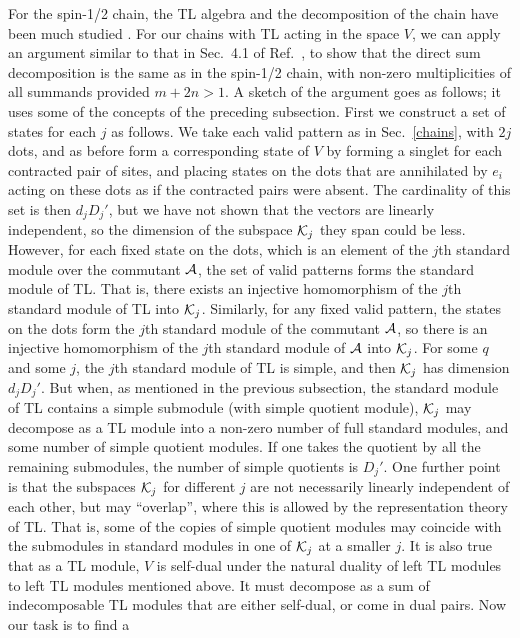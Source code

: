 \documentclass[twocolumn,floats,pra]{revtex4}
\def \cA {{\cal A}}
\begin{document}
For the spin-1/2 chain, the TL algebra and the decomposition of
the chain have been much studied
\cite{martinch7,gw,martin1,martin2}. For our chains with TL acting
in the space $V$, we can apply an argument similar to that in
Sec.\ 4.1 of Ref.\ \cite{martin2}, to show that the direct sum
decomposition is the same as in the spin-1/2 chain, with non-zero
multiplicities of all summands provided $m+2n>1$. A sketch of the
argument goes as follows; it uses some of the concepts of the
preceding subsection. First we construct a set of states for each
$j$ as follows. We take each valid pattern as in Sec.\
\ref{chains}, with $2j$ dots, and as before form a corresponding
state of $V$ by forming a singlet for each contracted pair of
sites, and placing states on the dots that are annihilated by
$e_i$ acting on these dots as if the contracted pairs were absent.
The cardinality of this set is then $d_jD_j'$, but we have not
shown that the vectors are linearly independent, so the dimension
of the subspace ${\cal K}_j$ they span could be less. However, for
each fixed state on the dots, which is an element of the $j$th
standard module over the commutant $\cA$, the set of valid
patterns forms the standard module of TL. That is, there exists an
injective homomorphism of the $j$th standard module of TL into
${\cal K}_j$. Similarly, for any fixed valid pattern, the states
on the dots form the $j$th standard module of the commutant $\cA$,
so there is an injective homomorphism of the $j$th standard module
of $\cA$ into ${\cal K}_j$. For some $q$ and some $j$, the $j$th
standard module of TL is simple, and then ${\cal K}_j$ has
dimension $d_jD_j'$. But when, as mentioned in the previous
subsection, the standard module of TL contains a simple submodule
(with simple quotient module), ${\cal K}_j$ may decompose as a TL
module into a non-zero number of full standard modules, and some
number of simple quotient modules. If one takes the quotient by
all the remaining submodules, the number of simple quotients is
$D_j'$. One further point is that the subspaces ${\cal K}_j$ for
different $j$ are not necessarily linearly independent of each
other, but may ``overlap'', where this is allowed by the
representation theory of TL. That is, some of the copies of simple
quotient modules may coincide with the submodules in standard
modules in one of ${\cal K}_j$ at a smaller $j$. It is also true
that as a TL module, $V$ is self-dual under the natural duality of
left TL modules to left TL modules mentioned above. It must
decompose as a sum of indecomposable TL modules that are either
self-dual, or come in dual pairs. Now our task is to find a
\end{document}
